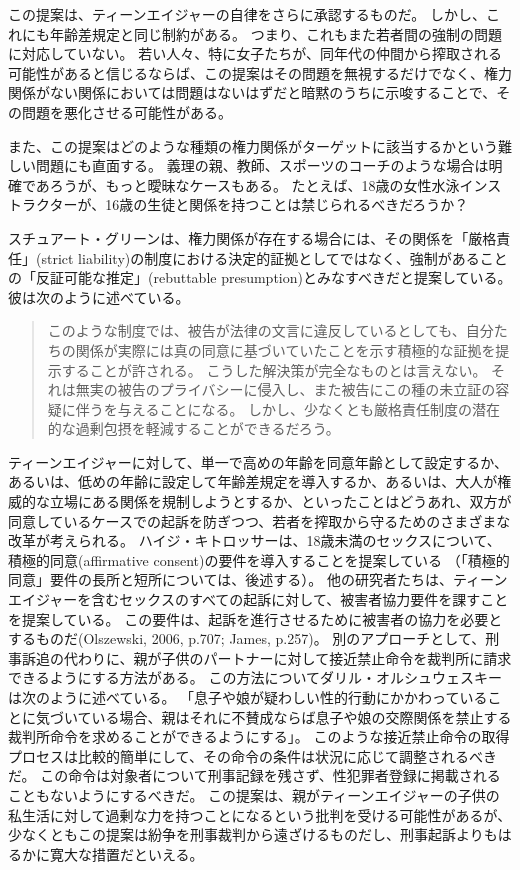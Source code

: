 \documentclass[paper=a4,book,openany]{jlreq} \usepackage{mystyle}
\begin{document}
この提案は、ティーンエイジャーの自律をさらに承認するものだ。
しかし、これにも年齢差規定と同じ制約がある。
つまり、これもまた若者間の強制の問題に対応していない。
若い人々、特に女子たちが、同年代の仲間から搾取される可能性があると信じるならば、この提案はその問題を無視するだけでなく、権力関係がない関係においては問題はないはずだと暗黙のうちに示唆することで、その問題を悪化させる可能性がある。

また、この提案はどのような種類の権力関係がターゲットに該当するかという難しい問題にも直面する。
義理の親、教師、スポーツのコーチのような場合は明確であろうが、もっと曖昧なケースもある。
たとえば、18歳の女性水泳インストラクターが、16歳の生徒と関係を持つことは禁じられるべきだろうか？

スチュアート・グリーンは、権力関係が存在する場合には、その関係を「厳格責任」(strict liability)の制度における決定的証拠としてではなく、強制があることの「反証可能な推定」(rebuttable presumption)とみなすべきだと提案している。
彼は次のように述べている。

\begin{quote}
このような制度では、被告が法律の文言に違反しているとしても、自分たちの関係が実際には真の同意に基づいていたことを示す積極的な証拠を提示することが許される。
こうした解決策が完全なものとは言えない。
それは無実の被告のプライバシーに侵入し、また被告にこの種の未立証の容疑に伴うを与えることになる。
しかし、少なくとも厳格責任制度の潜在的な過剰包摂を軽減することができるだろう。
\citep{green17:_how_crimin_inces}
\end{quote}

ティーンエイジャーに対して、単一で高めの年齢を同意年齢として設定するか、あるいは、低めの年齢に設定して年齢差規定を導入するか、あるいは、大人が権威的な立場にある関係を規制しようとするか、といったことはどうあれ、双方が同意しているケースでの起訴を防ぎつつ、若者を搾取から守るためのさまざまな改革が考えられる。
ハイジ・キトロッサーは、18歳未満のセックスについて、積極的同意(affirmative consent)の要件を導入することを提案している\citep{kitrosser97:_meanin_consen}
（「積極的同意」要件の長所と短所については、後述する）。
他の研究者たちは、ティーンエイジャーを含むセックスのすべての起訴に対して、被害者協力要件を課すことを提案している。
この要件は、起訴を進行させるために被害者の協力を必要とするものだ(Olszewski, 2006, p.707; James, p.257)。
\nocite{olszewski06:_commen_statut_rape_wiscon}\nocite{james09:_romeo_juliet_were_sex_offen}
別のアプローチとして、刑事訴追の代わりに、親が子供のパートナーに対して接近禁止命令を裁判所に請求できるようにする方法がある。
この方法についてダリル・オルシュウェスキーは次のように述べている。
「息子や娘が疑わしい性的行動にかかわっていることに気づいている場合、親はそれに不賛成ならば息子や娘の交際関係を禁止する裁判所命令を求めることができるようにする」\citep[p.718]{olszewski06:_commen_statut_rape_wiscon}。
このような接近禁止命令の取得プロセスは比較的簡単にして、その命令の条件は状況に応じて調整されるべきだ。
この命令は対象者について刑事記録を残さず、性犯罪者登録に掲載されることもないようにするべきだ。
この提案は、親がティーンエイジャーの子供の私生活に対して過剰な力を持つことになるという批判を受ける可能性があるが、少なくともこの提案は紛争を刑事裁判から遠ざけるものだし、刑事起訴よりもはるかに寛大な措置だといえる。
\end{document}
